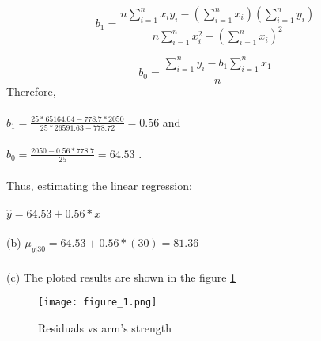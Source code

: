 \documentclass[10pt]{IEEEtran}
\begin{document}
\begin{equation}
\label{ec1}
b_{1} = \frac{n\sum_{i=1}^{n}x_{i}y_{i}-(\sum_{i=1}^{n}x_{i})(\sum_{i=1}^{n}y_{i})}{n\sum_{i=1}^{n}x_{i}^{2} - (\sum_{i=1}^{n}x_{i})^{2}} 
\end{equation}

\begin{equation}
\label{ec2}
b_{0} = \frac{\sum_{i=1}^{n}y_{i} - b_{1}\sum_{i=1}^{n} x_{1}}{n}
\end{equation}
 Therefore,\\\\
$b_{1} = \frac{25 * 65164.04 - 778.7*2050}{25*26591.63 - 778.72} = 0.56$ and\\\\
$b_{0} = \frac{2050 - 0.56*778.7}{25} = 64.53$ .\\\\

Thus, estimating the linear regression:\\\\
$ \hat{y} = 64.53 + 0.56 * x$\\\\

(b) $\mu_{{y}|{30}} = 64.53 + 0.56 * (30) = 81.36$\\\\
(c) The ploted results are shown in the figure \ref{plot1}



\begin{figure}
\texttt{[image: figure\_1.png]}
\caption{Residuals vs arm's strength}
\label{plot1}
\end{figure}




\end{document}
